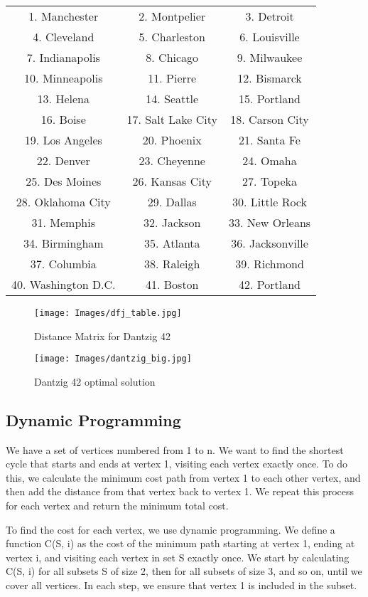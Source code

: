 \documentclass{article}
\begin{document}
\begin{center}
\begin{tabular}{ c c c }
 1. Manchester & 2. Montpelier & 3. Detroit \\
 4. Cleveland & 5. Charleston & 6. Louisville \\ 
 7. Indianapolis & 8. Chicago & 9. Milwaukee \\
 10. Minneapolis & 11. Pierre & 12. Bismarck \\
 13. Helena & 14. Seattle & 15. Portland \\
 16. Boise & 17. Salt Lake City & 18. Carson City \\
 19. Los Angeles & 20. Phoenix & 21. Santa Fe \\
 22. Denver & 23. Cheyenne & 24. Omaha \\
 25. Des Moines & 26. Kansas City & 27. Topeka \\
 28. Oklahoma City & 29. Dallas & 30. Little Rock \\
 31. Memphis & 32. Jackson & 33. New Orleans \\
 34. Birmingham & 35. Atlanta & 36. Jacksonville \\
 37. Columbia & 38. Raleigh & 39. Richmond \\
 40. Washington D.C. & 41. Boston & 42. Portland
\end{tabular}
\end{center}
\begin{figure}
    \texttt{[image: Images/dfj\_table.jpg]}
    \caption{Distance Matrix for Dantzig 42}
\end{figure}
\begin{figure}
    \texttt{[image: Images/dantzig\_big.jpg]}
    \caption{Dantzig 42 optimal solution}
\end{figure}
\subsection{Dynamic Programming}



We have a set of vertices numbered from 1 to n. We want to find the shortest cycle that starts and ends at vertex 1, visiting each vertex exactly once. To do this, we calculate the minimum cost path from vertex 1 to each other vertex, and then add the distance from that vertex back to vertex 1. We repeat this process for each vertex and return the minimum total cost.

To find the cost for each vertex, we use dynamic programming. We define a function C(S, i) as the cost of the minimum path starting at vertex 1, ending at vertex i, and visiting each vertex in set S exactly once. We start by calculating C(S, i) for all subsets S of size 2, then for all subsets of size 3, and so on, until we cover all vertices. In each step, we ensure that vertex 1 is included in the subset.
\end{document}
